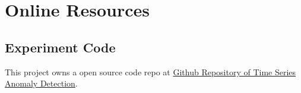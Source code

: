 
\chapter{Online Resources} %

\label{AppendixA} %

\section{Experiment Code}

This project owns a open source code repo at \href{https://github.com/puziyi/TSAD}{Github Repository of Time Series Anomaly Detection}.
